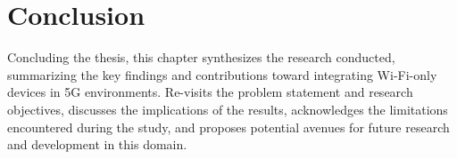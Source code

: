 \chapter{Conclusion}%
\label{chapter:conclusion}

\begin{introduction}
Concluding the thesis, this chapter synthesizes the research conducted, summarizing the key findings and contributions toward integrating Wi-Fi-only devices in 5G environments. Re-visits the problem statement and research objectives, discusses the implications of the results, acknowledges the limitations encountered during the study, and proposes potential avenues for future research and development in this domain.
\end{introduction}